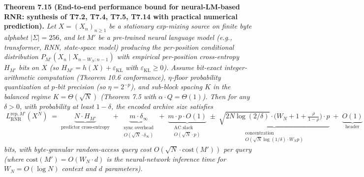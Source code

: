 \documentclass[
]{article}
\begin{document}
\textbf{Theorem 7.15 (End-to-end performance bound for neural-LM-based
RNR: synthesis of T7.2, T7.4, T7.5, T7.14 with practical numerical
prediction).}
\emph{Let $X = (X_n)_{n \geq 1}$ be a stationary exp-mixing source on
finite byte alphabet $|\Sigma| = 256$, and let $M'$ be a pre-trained
neural language model (e.g., transformer, RNN, state-space model)
producing the per-position conditional distribution
$P_{M'}(X_n \mid X_{n - W_N : n - 1})$ with empirical per-position
cross-entropy $H_{M'}$ bits on $X$ (so $H_{M'} = h(X) +
\varepsilon_{\mathrm{KL}}$ with $\varepsilon_{\mathrm{KL}} \geq 0$).
Assume bit-exact integer-arithmetic computation (Theorem 10.6
conformance), $\eta$-floor probability quantization at $p$-bit
precision (so $\eta = 2^{-p}$), and sub-block spacing $K$ in the
balanced regime $K = \Theta(\sqrt{N})$ (Theorem 7.5 with $\alpha
\cdot Q = \Theta(1)$). Then for any $\delta > 0$, with probability
at least $1 - \delta$, the encoded archive size satisfies}
\[
\boxed{
\;
L^{\mathrm{rep},M'}_{\mathrm{RNR}}(X^N)
\;=\;
\underbrace{N \cdot H_{M'}}_{\text{predictor cross-entropy}}
\;+\;
\underbrace{m \cdot \delta_\infty}_{\substack{\text{sync overhead} \\ O(\sqrt{N} \cdot \delta_\infty)}}
\;+\;
\underbrace{m \cdot p \cdot O(1)}_{\substack{\text{AC slack} \\ O(\sqrt{N} \cdot p)}}
\;\pm\;
\underbrace{\sqrt{2 N \log(2/\delta)} \cdot \bigl(W_N + 1 + \tfrac{\rho}{1-\rho}\bigr) \cdot p}_{\substack{\text{concentration} \\ O(\sqrt{N} \log(1/\delta) \cdot W_N p)}}
\;+\;
\underbrace{O(1)}_{\text{header}}
\;
}
\]
\emph{bits, with byte-granular random-access query cost
$O(\sqrt{N} \cdot \mathrm{cost}(M'))$ per query (where
$\mathrm{cost}(M') = O(W_N \cdot d)$ is the neural-network inference
time for $W_N = O(\log N)$ context and $d$ parameters).}
\end{document}
